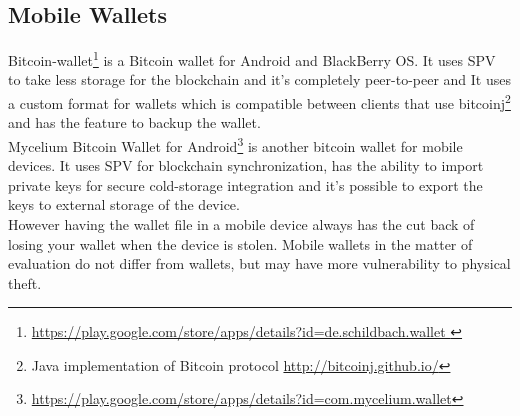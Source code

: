 \subsection{Mobile Wallets}
Bitcoin-wallet\footnote{\url{https://play.google.com/store/apps/details?id=de.schildbach.wallet }} is a Bitcoin wallet for Android and BlackBerry OS. It uses SPV to take less storage for the blockchain and it's completely peer-to-peer and It uses a custom format for wallets which is compatible between clients that use bitcoinj\footnote{Java implementation of Bitcoin protocol \url{http://bitcoinj.github.io/}} and has the feature to backup the wallet.\\
Mycelium Bitcoin Wallet for Android\footnote{\url {https://play.google.com/store/apps/details?id=com.mycelium.wallet}} is another bitcoin wallet for mobile devices. It uses SPV for blockchain synchronization, has the ability to import private keys for secure cold-storage integration and it's possible to export the keys to external storage of the device.\\ 
However having the wallet file in a mobile device always has the cut back of losing your wallet when the device is stolen.
Mobile wallets in the matter of evaluation do not differ from wallets, but may have more vulnerability to physical theft.
